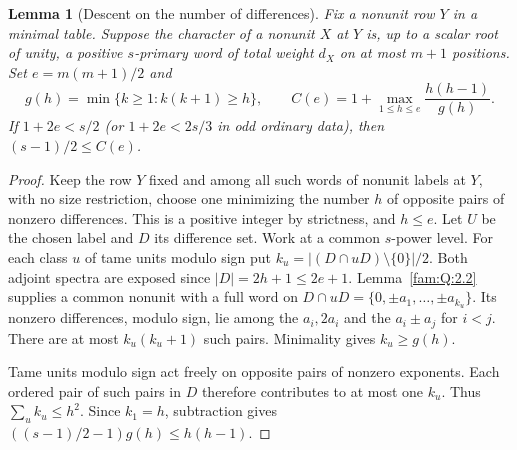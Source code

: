 \documentclass[11pt,a4paper]{article}
\numberwithin{equation}{section}
\newtheorem{lemma}[theorem]{Lemma}
\theoremstyle{remark}
\begin{document}
\begin{lemma}[Descent on the number of differences]\label{fam:Q:2.3}\label{fam:Q:n:lem:j11-descent}
Fix a nonunit row $Y$ in a minimal table. Suppose the character
of a nonunit $X$ at $Y$ is, up to a scalar root of unity, a
positive $s$-primary word of total weight $d_X$ on at most $m+1$
positions. Set $e=m(m+1)/2$ and
\[
 g(h)=\min\{k\ge1:k(k+1)\ge h\},\qquad
 C(e)=1+\max_{1\le h\le e}\frac{h(h-1)}{g(h)} .
\]
If $1+2e<s/2$ (or $1+2e<2s/3$ in odd ordinary data), then
$(s-1)/2\le C(e)$.
\end{lemma}
\begin{proof}
Keep the row $Y$ fixed and among all such words of nonunit labels
at $Y$, with no size restriction, choose one minimizing the number
$h$ of opposite pairs of nonzero differences. This is a positive
integer by strictness, and $h\le e$. Let $U$ be the chosen label
and $D$ its difference set. Work at a common $s$-power level.
For each class $u$ of tame units modulo sign put
$k_u=|(D\cap uD)\setminus\{0\}|/2$.
Both adjoint spectra are exposed since $|D|=2h+1\le2e+1$.
Lemma~\ref{fam:Q:2.2} supplies a common nonunit with a full word on
$D\cap uD=\{0,\pm a_1,\ldots,\pm a_{k_u}\}$.
Its nonzero differences, modulo sign, lie among the $a_i,2a_i$
and the $a_i\pm a_j$ for $i<j$. There are at most
$k_u(k_u+1)$ such pairs. Minimality gives $k_u\ge g(h)$.

Tame units modulo sign act freely on opposite pairs of nonzero
exponents. Each ordered pair of such pairs in $D$ therefore
contributes to at most one $k_u$. Thus $\sum_u k_u\le h^2$.
Since $k_1=h$, subtraction gives
$((s-1)/2-1)g(h)\le h(h-1)$.
\end{proof}
\end{document}

